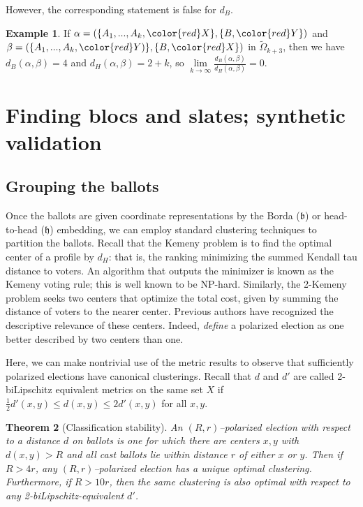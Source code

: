 \documentclass{amsart}
\newcommand{\WO}{\widetilde{\Omega}}
\newcommand{\bb}{\mathfrak{b}}
\newcommand{\hh}{\mathfrak{h}}
\theoremstyle{plain}
\newtheorem{theorem}{Theorem}[section]
\theoremstyle{definition}
\newtheorem{example}[theorem]{Example}
\theoremstyle{remark}
\begin{document}
However, the corresponding statement is false for $d_B$.
\begin{example}
If $\alpha=(\{A_1,...,A_k,{\color{red}X}\},\{B,{\color{red}Y}\})$ and $\beta=(\{A_1,...,A_k,{\color{red}Y})\},\{B,{\color{red}X}\})$ in $\WO_{k+3}$, then we have $d_B(\alpha,\beta) = 4$ and $d_{H}(\alpha,\beta) = 2+k$, so $\lim\limits_{k\to\infty}\displaystyle\frac{d_{B}(\alpha,\beta)}{d_{H}(\alpha,\beta)} = 0$.  
\end{example}
\FloatBarrier
\section{Finding blocs and slates; synthetic validation}
\label{sec:coordinate-clusters}

\subsection{Grouping the ballots}\label{subsec:opti}

Once the ballots are given coordinate representations by the Borda ($\bb$) or head-to-head ($\hh$) embedding, we can employ standard clustering techniques to partition the ballots.  Recall that the Kemeny problem is to find the optimal center of a profile by $d_H$:  that is, the ranking minimizing the summed Kendall tau distance to voters.  
An algorithm that outputs the minimizer is known as the Kemeny voting rule; this is well known to be NP-hard.  Similarly, the 2-Kemeny problem seeks two centers that optimize the total cost, given by summing the distance of voters to the nearer center. Previous authors have recognized the descriptive relevance of these centers.  Indeed, \citet{Faliszewski_Kaczmarczyk_Sornat_Szufa_Wąs_2023} {\em define} a polarized election as one better described by two centers than one. 

Here, we can make nontrivial use of the metric results to observe that sufficiently polarized elections have canonical clusterings.  Recall that  $d$ and $d'$ are called 2-biLipschitz equivalent metrics on the same set $X$ if $\frac 12 d'(x,y)\le d(x,y) \le 2 d'(x,y)$ for all $x,y$.

\begin{theorem}[Classification stability]
An $(R,r)$--polarized election with respect to a distance $d$ on ballots is one for which there are centers $x,y$ with $d(x,y)>R$ and all cast ballots lie within distance $r$ of either $x$ or $y$.
Then if $R>4r$, any $(R,r)$--polarized election has a unique optimal clustering.  Furthermore, if $R>10r$, then the same clustering is also optimal with respect to any 2-biLipschitz-equivalent $d'$.  
\end{theorem}
\end{document}
